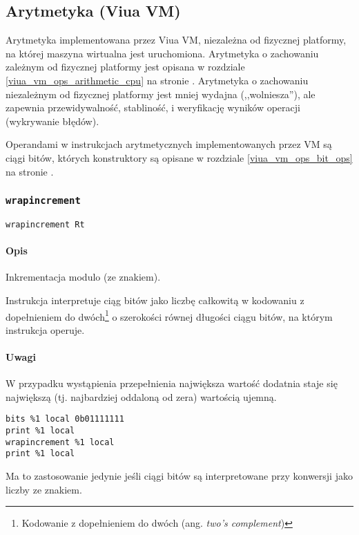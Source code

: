 \subsection{Arytmetyka (Viua VM)}
\label{viua_vm_ops_arithmetic_vm}

Arytmetyka implementowana przez Viua VM, niezależna od fizycznej platformy, na
której maszyna wirtualna jest uruchomiona. Arytmetyka o zachowaniu zależnym od
fizycznej platformy jest opisana w rozdziale \ref{viua_vm_ops_arithmetic_cpu} na
stronie \pageref{viua_vm_ops_arithmetic_cpu}. Arytmetyka o zachowaniu
niezależnym od fizycznej platformy jest mniej wydajna (,,wolniesza''), ale
zapewnia przewidywalność, stabliność, i weryfikację wyników operacji (wykrywanie
błędów).

Operandami w instrukcjach arytmetycznych implementowanych przez VM są ciągi
bitów, których konstruktory są opisane w rozdziale \ref{viua_vm_ops_bit_ops} na
stronie \pageref{viua_vm_ops_bit_ops}.

\subsubsection{\texttt{wrapincrement}}

\begin{lstlisting}
wrapincrement Rt
\end{lstlisting}

\paragraph*{Opis} Inkrementacja modulo (ze znakiem).

Instrukcja interpretuje ciąg bitów jako liczbę całkowitą w kodowaniu z
dopełnieniem do dwóch\footnote{Kodowanie z dopełnieniem do dwóch
(ang. \emph{two's complement})} o szerokości równej długości ciągu bitów, na
którym instrukcja operuje.

\paragraph*{Uwagi}

W przypadku wystąpienia przepełnienia największa wartość dodatnia staje się
największą (tj. najbardziej oddaloną od zera) wartością ujemną.
\begin{lstlisting}
bits %1 local 0b01111111
print %1 local
wrapincrement %1 local
print %1 local
\end{lstlisting}
Ma to zastosowanie jedynie jeśli ciągi bitów są interpretowane przy konwersji
jako liczby ze znakiem.

